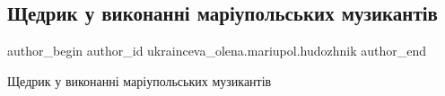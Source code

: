  
 
 
 
 

\subsection{Щедрик у виконанні маріупольських музикантів}
\label{sec:13_12_2022.fb.ukrainceva_olena.mariupol.hudozhnik.1.shchedrik_u_vikonann}

\ifcmt
 author_begin
   author_id ukrainceva_olena.mariupol.hudozhnik
 author_end
\fi

Щедрик у виконанні маріупольських музикантів

